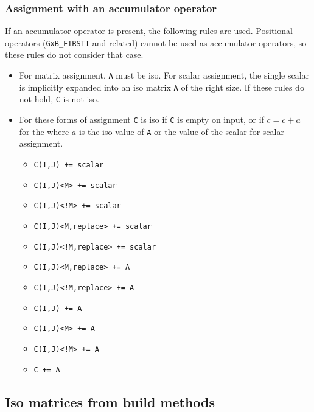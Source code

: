 \documentclass[12pt]{article}
\begin{document}
\subsubsection{Assignment with an accumulator operator}

If an accumulator operator is present, the following rules are used.
Positional operators (\verb'GxB_FIRSTI' and related) cannot be used as
accumulator operators, so these rules do not consider that case.

\begin{itemize}
\item 
For matrix assignment, \verb'A' must be iso.  For scalar assignment, the single
scalar is implicitly expanded into an iso matrix \verb'A' of the right size.
If these rules do not hold, \verb'C' is not iso.

\item For these forms of assignment \verb'C' is iso if \verb'C' is 
empty on input, or if $c=c+a$ for the where $a$ is the iso value of \verb'A' or
the value of the scalar for scalar assignment.

                \begin{itemize}
                \item \verb'C(I,J) += scalar'
                \item \verb'C(I,J)<M> += scalar'
                \item \verb'C(I,J)<!M> += scalar'
                \item \verb'C(I,J)<M,replace> += scalar'
                \item \verb'C(I,J)<!M,replace> += scalar'
                \item \verb'C(I,J)<M,replace> += A'
                \item \verb'C(I,J)<!M,replace> += A'
                \item \verb'C(I,J) += A'
                \item \verb'C(I,J)<M> += A'
                \item \verb'C(I,J)<!M> += A '
                \item \verb'C += A'
                \end{itemize}
\end{itemize}

\subsection{Iso matrices from build methods}
\label{iso_build}
\end{document}
